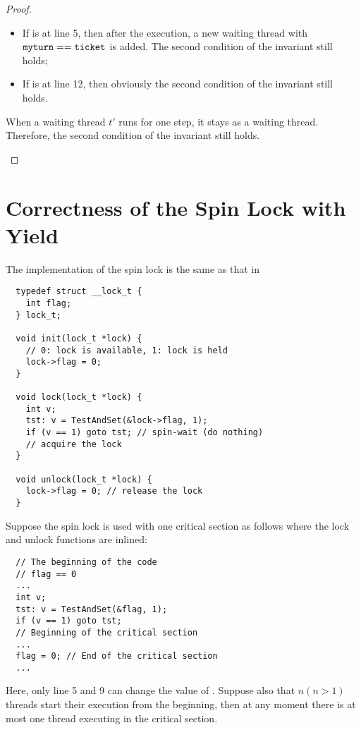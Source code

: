 \documentclass{article}[10pt]
\begin{document}
\begin{proof}
\begin{itemize}
\begin{itemize}
    \item If  is at line 5, then after the execution, a new
      waiting thread with $\text{\ttfamily myturn} == \text{\ttfamily ticket}$ is added. The second
      condition of the invariant still holds;

    \item If  is at line 12, then obviously the second
      condition of the invariant still holds.

    \end{itemize}
    When a waiting thread $t'$ runs for one step, it stays as a
    waiting thread. Therefore, the second condition of the invariant
    still holds.
    
  \end{itemize}


\end{proof}


\section{Correctness of the Spin Lock with Yield}
\label{sec:spin-lock-yield}


\begin{mythm}
\label{thm:spin-lock-correct-yield}

The implementation of the spin lock is the same as that in

%
\begin{lstlisting}
  typedef struct __lock_t {
    int flag;
  } lock_t;

  void init(lock_t *lock) {
    // 0: lock is available, 1: lock is held
    lock->flag = 0;
  }

  void lock(lock_t *lock) {
    int v;
    tst: v = TestAndSet(&lock->flag, 1);
    if (v == 1) goto tst; // spin-wait (do nothing)
    // acquire the lock
  }

  void unlock(lock_t *lock) {
    lock->flag = 0; // release the lock
  }  
\end{lstlisting}
%
Suppose the spin lock is used with one critical section as follows
where the lock and unlock functions are inlined:
%
\begin{lstlisting}
  // The beginning of the code
  // flag == 0
  ...
  int v;
  tst: v = TestAndSet(&flag, 1);
  if (v == 1) goto tst;
  // Beginning of the critical section
  ...
  flag = 0; // End of the critical section
  ...
\end{lstlisting}
%
Here, only line 5 and 9 can change the value of \kflag.
%
Suppose also that $n (n > 1)$ threads start their execution from the
beginning, then at any moment there is at most one thread executing in
the critical section.
\end{mythm}
\end{document}
